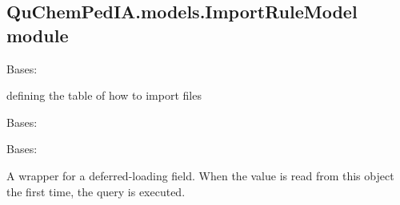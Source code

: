\documentclass[letterpaper,10pt,english]{sphinxmanual}
\begin{document}
\subsection{QuChemPedIA.models.ImportRuleModel module}
\label{\detokenize{QuChemPedIA.models:module-QuChemPedIA.models.ImportRuleModel}}\label{\detokenize{QuChemPedIA.models:quchempedia-models-importrulemodel-module}}

\begin{fulllineitems}
\label{\detokenize{QuChemPedIA.models:QuChemPedIA.models.ImportRuleModel.ImportRule}}
Bases: 

defining the table of how to import files

\begin{fulllineitems}
\label{\detokenize{QuChemPedIA.models:QuChemPedIA.models.ImportRuleModel.ImportRule.DoesNotExist}}
Bases: 

\end{fulllineitems}


\begin{fulllineitems}
\label{\detokenize{QuChemPedIA.models:QuChemPedIA.models.ImportRuleModel.ImportRule.MultipleObjectsReturned}}
Bases: 

\end{fulllineitems}


\begin{fulllineitems}
\label{\detokenize{QuChemPedIA.models:QuChemPedIA.models.ImportRuleModel.ImportRule.id_rule}}
A wrapper for a deferred-loading field. When the value is read from this
object the first time, the query is executed.


\end{fulllineitems}
\end{fulllineitems}
\end{document}
